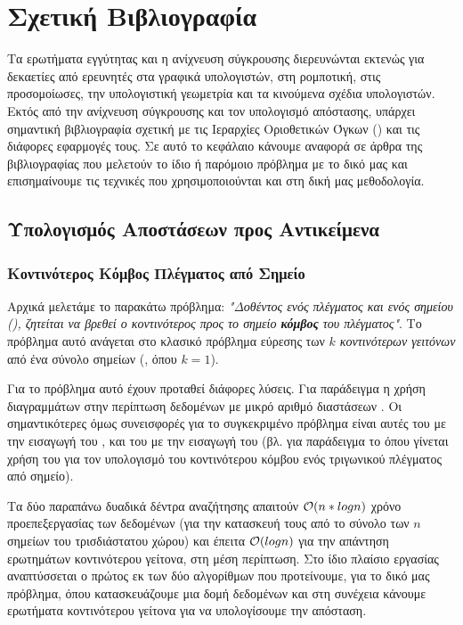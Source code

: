 \chapter{Σχετική Βιβλιογραφία}
\label{ch:related_work}
Τα ερωτήματα εγγύτητας και η ανίχνευση σύγκρουσης διερευνώνται 
εκτενώς για δεκαετίες από ερευνητές στα γραφικά υπολογιστών, στη ρομποτική,
στις προσομοίωσες, την υπολογιστική γεωμετρία και τα κινούμενα σχέδια 
υπολογιστών. 
Εκτός από την ανίχνευση σύγκρουσης και τον υπολογισμό απόστασης, υπάρχει
σημαντική βιβλιογραφία σχετική με τις Ιεραρχίες Οριοθετικών Όγκων 
() και τις διάφορες εφαρμογές τους. 
Σε αυτό το κεφάλαιο κάνουμε αναφορά σε άρθρα της βιβλιογραφίας 
που μελετούν το ίδιο ή παρόμοιο πρόβλημα με το δικό μας
και επισημαίνουμε τις τεχνικές που χρησιμοποιούνται 
και στη δική μας μεθοδολογία.

\section{Υπολογισμός Αποστάσεων προς Αντικείμενα}

\subsection{Κοντινότερος Κόμβος Πλέγματος από Σημείο}
\label{sec:nearest_node}
Αρχικά μελετάμε το παρακάτω πρόβλημα: \textit{"Δοθέντος ενός 
πλέγματος και ενός σημείου (), ζητείται να βρεθεί 
ο κοντινότερος προς το σημείο \textbf{κόμβος} του πλέγματος"}.
Το πρόβλημα αυτό ανάγεται στο κλασικό πρόβλημα εύρεσης των \textit{$k$ 
κοντινότερων γειτόνων} από ένα σύνολο σημείων (, όπου $k=1$). 

Για το πρόβλημα αυτό έχουν προταθεί διάφορες λύσεις. Για παράδειγμα 
η χρήση διαγραμμάτων  στην περίπτωση δεδομένων 
με μικρό αριθμό διαστάσεων \cite{aurenhammer1991voronoi}.
Οι σημαντικότερες όμως συνεισφορές για το συγκεκριμένο πρόβλημα είναι 
αυτές του \cite{bentley1975multidimensional} με την εισαγωγή του 
\textit{}, και του \cite{yianilos1993data} με την 
εισαγωγή του \textit{} (βλ. για παράδειγμα το
\cite{simon1996fast} όπου γίνεται χρήση του \textit{} για τον 
υπολογισμό του κοντινότερου κόμβου ενός τριγωνικού πλέγματος 
από σημείο).

Τα δύο παραπάνω δυαδικά δέντρα αναζήτησης απαιτούν $\mathcal{O}(n*logn)$
χρόνο προεπεξεργασίας των δεδομένων (για την κατασκευή τους
από το σύνολο των $n$ σημείων του τρισδιάστατου χώρου) και 
έπειτα $\mathcal{O}(logn)$ για την απάντηση ερωτημάτων κοντινότερου 
γείτονα, στη μέση περίπτωση. 
Στο ίδιο πλαίσιο εργασίας αναπτύσσεται ο πρώτος εκ των δύο αλγορίθμων που 
προτείνουμε, για το δικό μας πρόβλημα, όπου κατασκευάζουμε μια δομή 
δεδομένων και στη συνέχεια κάνουμε ερωτήματα κοντινότερου γείτονα 
για να υπολογίσουμε την απόσταση.

